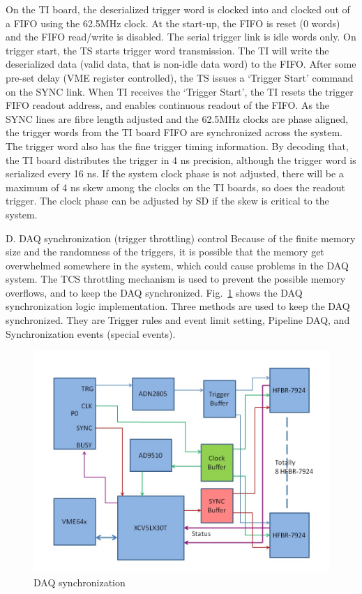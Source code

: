 On the TI board, the deserialized trigger word is clocked into and clocked out of a FIFO using the 62.5MHz clock.  At the start-up, the FIFO is reset (0 words) and the FIFO read/write is disabled.  The serial trigger link is idle words only.  On trigger start, the TS starts trigger word transmission.  The TI will write the deserialized data (valid data, that is non-idle data word) to the FIFO.  After some pre-set delay (VME register controlled), the TS issues a ‘Trigger Start’ command on the SYNC link.  When TI receives the ‘Trigger Start’, the TI resets the trigger FIFO readout address, and enables continuous readout of the FIFO.  As the SYNC lines are fibre length adjusted and the 62.5MHz clocks are phase aligned, the trigger words from the TI board FIFO are synchronized across the system.
The trigger word also has the fine trigger timing information.  By decoding that, the TI board distributes the trigger in 4 ns precision, although the trigger word is serialized every 16 ns.  If the system clock phase is not adjusted, there will be a maximum of 4 ns skew among the clocks on the TI boards, so does the readout trigger.  The clock phase can be adjusted by SD if the skew is critical to the system.

D.	DAQ synchronization (trigger throttling) control
Because of the finite memory size and the randomness of the triggers, it is possible that the memory get overwhelmed somewhere in the system, which could cause problems in the DAQ system.   The TCS throttling mechanism is used to prevent the possible memory overflows, and to keep the DAQ synchronized.  Fig.~\ref{fig:DAQ_synchronization} shows the DAQ synchronization logic implementation.  Three methods are used to keep the DAQ synchronized.  They are Trigger rules and event limit setting, Pipeline DAQ, and Synchronization events (special events).

\begin{figure}[hbt]
	\centering
	\includegraphics[width=1.0\columnwidth,keepaspectratio]{img/TDdiagram.jpg}
	\caption{DAQ synchronization}
	\label{fig:DAQ_synchronization}
\end{figure}


